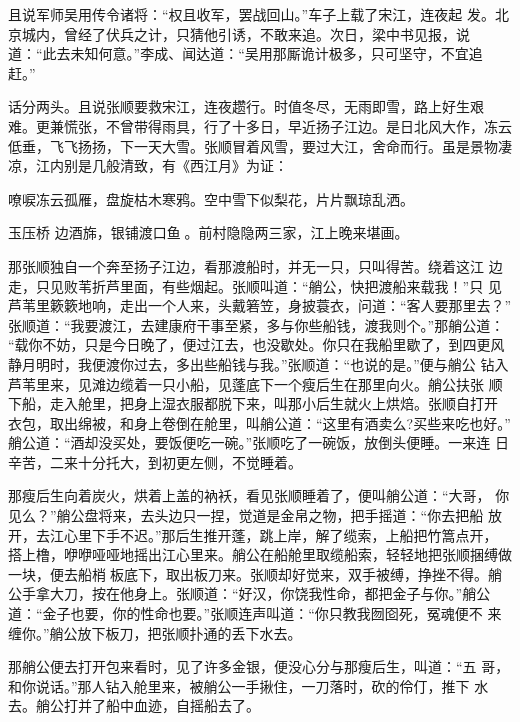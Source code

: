 且说军师吴用传令诸将：“权且收军，罢战回山。”车子上载了宋江，连夜起
发。北京城内，曾经了伏兵之计，只猜他引诱，不敢来追。次日，梁中书见报，说
道：“此去未知何意。”李成、闻达道：“吴用那厮诡计极多，只可坚守，不宜追
赶。”

话分两头。且说张顺要救宋江，连夜趱行。时值冬尽，无雨即雪，路上好生艰
难。更兼慌张，不曾带得雨具，行了十多日，早近扬子江边。是日北风大作，冻云
低垂，飞飞扬扬，下一天大雪。张顺冒着风雪，要过大江，舍命而行。虽是景物凄
凉，江内别是几般清致，有《西江月》为证：

嘹唳冻云孤雁，盘旋枯木寒鸦。空中雪下似梨花，片片飘琼乱洒。

玉压桥
边酒旆，银铺渡口鱼。前村隐隐两三家，江上晚来堪画。

那张顺独自一个奔至扬子江边，看那渡船时，并无一只，只叫得苦。绕着这江
边走，只见败苇折芦里面，有些烟起。张顺叫道：“艄公，快把渡船来载我！”只
见芦苇里簌簌地响，走出一个人来，头戴箬笠，身披蓑衣，问道：“客人要那里去？”
张顺道：“我要渡江，去建康府干事至紧，多与你些船钱，渡我则个。”那艄公道：
“载你不妨，只是今日晚了，便过江去，也没歇处。你只在我船里歇了，到四更风
静月明时，我便渡你过去，多出些船钱与我。”张顺道：“也说的是。”便与艄公
钻入芦苇里来，见滩边缆着一只小船，见蓬底下一个瘦后生在那里向火。艄公扶张
顺下船，走入舱里，把身上湿衣服都脱下来，叫那小后生就火上烘焙。张顺自打开
衣包，取出绵被，和身上卷倒在舱里，叫艄公道：“这里有酒卖么?买些来吃也好。”
艄公道：“酒却没买处，要饭便吃一碗。”张顺吃了一碗饭，放倒头便睡。一来连
日辛苦，二来十分托大，到初更左侧，不觉睡着。

那瘦后生向着炭火，烘着上盖的衲袄，看见张顺睡着了，便叫艄公道：“大哥，
你见么？”艄公盘将来，去头边只一捏，觉道是金帛之物，把手摇道：“你去把船
放开，去江心里下手不迟。”那后生推开蓬，跳上岸，解了缆索，上船把竹篙点开，
搭上橹，咿咿哑哑地摇出江心里来。艄公在船舱里取缆船索，轻轻地把张顺捆缚做
一块，便去船梢板底下，取出板刀来。张顺却好觉来，双手被缚，挣挫不得。艄
公手拿大刀，按在他身上。张顺道：“好汉，你饶我性命，都把金子与你。”艄公
道：“金子也要，你的性命也要。”张顺连声叫道：“你只教我囫囵死，冤魂便不
来缠你。”艄公放下板刀，把张顺扑通的丢下水去。

那艄公便去打开包来看时，见了许多金银，便没心分与那瘦后生，叫道：“五
哥，和你说话。”那人钻入舱里来，被艄公一手揪住，一刀落时，砍的伶仃，推下
水去。艄公打并了船中血迹，自摇船去了。

